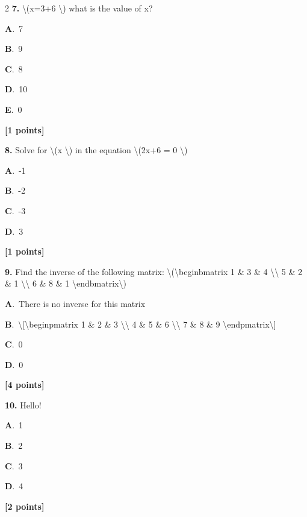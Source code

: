\documentclass[12pt]{article}
\newcommand{\choice}[3]{%
  \noindent\textbf{#1}.~#2\hfill#3\par\vspace{0.25em}
}
\begin{document}
\begin{multicols}{2}
\noindent \textbf{\textenglish{7.}} {\textenglish{\textbackslash{}(x=3+6 \textbackslash{}) what is the value of x?}}

\noindent\choice{A}{{\textenglish{7}}}{}
\noindent\choice{B}{{\textenglish{9}}}{}
\noindent\choice{C}{{\textenglish{8}}}{}
\noindent\choice{D}{{\textenglish{10}}}{}
\noindent\choice{E}{{\textenglish{0}}}{}
\hfill \textbf{[1 points]}\vspace{0.5em}

\noindent \textbf{\textenglish{8.}} {\textenglish{Solve for \textbackslash{}(x \textbackslash{}) in the equation \textbackslash{}(2x+6 = 0 \textbackslash{})}}

\noindent\choice{A}{{\textenglish{-1}}}{}
\noindent\choice{B}{{\textenglish{-2}}}{}
\noindent\choice{C}{{\textenglish{-3}}}{}
\noindent\choice{D}{{\textenglish{3}}}{}
\hfill \textbf{[1 points]}\vspace{0.5em}

\noindent \textbf{\textenglish{9.}} {\textenglish{Find the inverse of the following matrix: \textbackslash{}(\textbackslash{}begin{bmatrix} 1 \& 3 \& 4 \textbackslash{}\textbackslash{} 5 \& 2 \& 1 \textbackslash{}\textbackslash{} 6 \& 8 \& 1 \textbackslash{}end{bmatrix}\textbackslash{})}}

\noindent\choice{A}{{\textenglish{There is no inverse for this matrix}}}{}
\noindent\choice{B}{{\textenglish{\textbackslash{}[\textbackslash{}begin{pmatrix} 1 \& 2 \& 3 \textbackslash{}\textbackslash{} 4 \& 5 \& 6 \textbackslash{}\textbackslash{} 7 \& 8 \& 9  \textbackslash{}end{pmatrix}\textbackslash{}]}}}{}
\noindent\choice{C}{{\textenglish{0}}}{}
\noindent\choice{D}{{\textenglish{0}}}{}
\hfill \textbf{[4 points]}\vspace{0.5em}

\noindent \textbf{\textenglish{10.}} {\textenglish{Hello!}}

\noindent\choice{A}{{\textenglish{1}}}{}
\noindent\choice{B}{{\textenglish{2}}}{}
\noindent\choice{C}{{\textenglish{3}}}{}
\noindent\choice{D}{{\textenglish{4}}}{}
\hfill \textbf{[2 points]}\vspace{0.5em}


\end{multicols}
\end{document}
